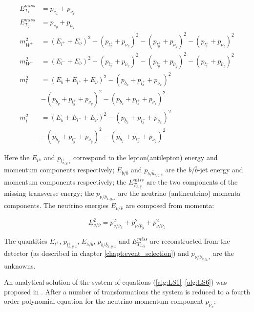 \begin{align}\label{alg:LS1}
 E^{miss}_{T_{x}} & =  p_{\nu_{x}} + p_{\bar{\nu}_{x}} \\
 E^{miss}_{T_{y}} & =  p_{\nu_{y}} + p_{\bar{\nu}_{y}} \\
 m^{2}_{W^{+}} & = (E_{l^{+}} + E_{\nu})^{2} - (p_{l^{+}_{x}} + p_{\nu_{x}})^{2} - (p_{l^{+}_{y}} + p_{\nu_{y}})^{2} - (p_{l^{+}_{z}} + p_{\nu_{z}})^2 \\
 m^{2}_{W^{-}} & = (E_{l^{-}} + E_{\bar{\nu}})^{2} - (p_{l^{-}_{x}} + p_{\bar{\nu}_{x}})^{2} - (p_{l^{-}_{y}} + p_{\bar{\nu}_{y}})^{2} - (p_{l^{-}_{z}} + p_{\bar{\nu}_{z}})^2 \\
 m_{t}^{2} & = (E_{b} + E_{l^{+}} + E_{\nu})^{2} - (p_{b_{x}} + p_{l^{+}_{x}} + p_{\nu_{x}})^2 \nonumber \\
           & - (p_{b_{y}} + p_{l^{+}_{y}} + p_{\nu_{y}})^2 - (p_{b_{z}} + p_{l^{+}_{z}} + p_{\nu_{z}})^2 \\
 m_{\bar{t}}^{2} & = (E_{\bar{b}} + E_{l^{-}} + E_{\bar{\nu}})^{2} - (p_{\bar{b}_{x}} + p_{l^{-}_{x}} + p_{\bar{\nu}_{x}})^2 \nonumber \\
                 & - (p_{\bar{b}_{y}} + p_{l^{-}_{y}} + p_{\bar{\nu}_{y}})^2 - (p_{\bar{b}_{z}} + p_{l^{-}_{z}} + p_{\bar{\nu}_{z}})^2\label{alg:LS6} 
\end{align}

Here the $E_{l^{\pm}}$ and $p_{l^{\pm}_{x,y,z}}$ correspond to the lepton(antilepton) energy and momentum components respectively; 
$E_{b/\bar{b}}$ and $p_{b/\bar{b}_{x,y,z}}$ are the $b$/$\bar{b}$-jet energy and momentum components respectively; the $E^{miss}_{T_{x,y}}$ are
the two components of the missing transverse energy; the $p_{\nu/\bar{\nu}_{x,y,z}}$ are the neutrino (antineutrino) momenta components.
The neutrino energies $ E_{\nu/\bar{\nu}}$ are composed from momenta:

\begin{equation}
 E_{\nu/\bar{\nu}}^{2} = p_{\nu/\bar{\nu}_{x}}^{2} + p_{\nu/\bar{\nu}_{y}}^{2} + p_{\nu/\bar{\nu}_{z}}^{2}
\end{equation}

The quantities $E_{l^{\pm}}$, $p_{l^{\pm}_{x,y,z}}$, $E_{b/\bar{b}}$, $p_{b/\bar{b}_{x,y,z}}$ and $E^{miss}_{T_{x,y}}$ are reconstructed from the detector (as described in chapter \ref{chapt:event_selection})
and $p_{\nu/\bar{\nu}_{x,y,z}}$ are the unknowns.

An analytical solution of the system of equations (\ref{alg:LS1}--\ref{alg:LS6}) was proposed in \cite{LSpaper}. After a number of transformations
the system is reduced to a fourth order polynomial equation for the neutrino momentum component $p_{\nu_{x}}$:

